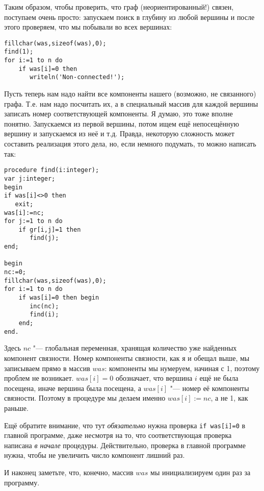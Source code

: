Таким образом, чтобы проверить, что граф (неориентированный!) связен, поступаем очень просто: запускаем поиск в 
глубину из любой вершины и после этого проверяем, что мы побывали во всех вершинах:

\begin{codesampleo}\begin{verbatim}
fillchar(was,sizeof(was),0);
find(1);
for i:=1 to n do
    if was[i]=0 then
       writeln('Non-connected!');
\end{verbatim}
\end{codesampleo}

Пусть теперь нам надо найти все компоненты нашего (возможно, не связанного) графа. Т.е. нам надо посчитать их, а в
специальный массив для каждой вершины записать номер соответствующей компоненты. Я думаю, это тоже вполне понятно.
Запускаемся из первой вершины, потом ищем ещё непосещённую вершину и запускаемся из неё и т.д. Правда, некоторую сложность
может составить реализация этого дела, но, если немного подумать, то можно написать так:
\begin{codesample}\begin{verbatim}
procedure find(i:integer);
var j:integer;
begin
if was[i]<>0 then
   exit;
was[i]:=nc;
for j:=1 to n do
    if gr[i,j]=1 then
       find(j);
end;

begin
nc:=0;
fillchar(was,sizeof(was),0);
for i:=1 to n do
    if was[i]=0 then begin
       inc(nc);
       find(i);
    end;
end.
\end{verbatim}
\end{codesample}

Здесь $nc$ "--- глобальная переменная, хранящая количество уже найденных компонент связности. Номер компоненты связности,
как я и обещал выше, мы записываем прямо в массив $was$: компоненты мы нумеруем, начиная с 1, поэтому проблем не возникает.
$was[i]=0$ обозначает, что вершина $i$ ещё не была посещена, иначе вершина была посещена, а $was[i]$ "--- номер
её компоненты связности. Поэтому в процедуре мы делаем именно $was[i]:=nc$, а не 1, как раньше.

Ещё обратите внимание, что тут \textit{обязательно} нужна проверка \texttt{if was[i]=0} в главной программе, даже
несмотря на то, что соответствующая проверка написана \textit{в начале} процедуры. Действительно, проверка в главной
программе нужна, чтобы не увеличить число компонент лишний раз.

И наконец заметьте, что, конечно, массив $was$ мы инициализируем один раз за программу.

